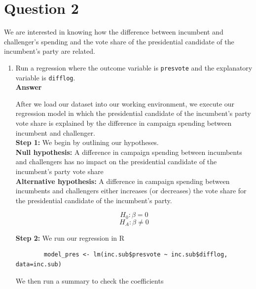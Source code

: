 \documentclass[12pt,letterpaper]{article}
\begin{document}
	\newpage
	
	
\section*{Question 2}
\noindent We are interested in knowing how the difference between incumbent and challenger's spending and the vote share of the presidential candidate of the incumbent's party are related.	\vspace{.25cm}
	\begin{enumerate}
		\item Run a regression where the outcome variable is \texttt{presvote} and the explanatory variable is \texttt{difflog}. \\
		
		\noindent 
		\textbf{Answer}
		
		After we load our dataset into our working environment, we execute our regression
		model in which the presidential candidate of the incumbent's party vote share is explained by the difference in campaign spending between incumbent and challenger. \\
		
		
		
		\textbf{Step 1:} We begin by outlining our hypotheses. \\
		
		\textbf{Null hypothesis: }
		A difference in campaign spending between incumbents and challengers has no impact on the presidential candidate of the incumbent's party vote share \\
		
		\textbf{Alternative hypothesis: }
		A difference in campaign spending between incumbents and challengers either increases (or decreases) the vote share for the presidential candidate of the incumbent's party.
		
		$$H_0: \beta = 0$$
		$$H_A: \beta \neq 0$$
		
		\vspace{.25cm}
		
		
		\textbf{Step 2:} We run our regression in R
		
		\begin{verbatim}
		model_pres <- lm(inc.sub$presvote ~ inc.sub$difflog, data=inc.sub)

		\end{verbatim}
		
		We then run a summary to check the coefficients
		

\end{enumerate}
\end{document}
